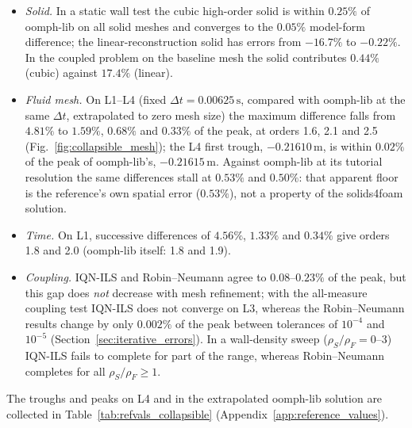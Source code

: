 \begin{itemize}
	\item \emph{Solid.} In a static wall test the cubic high-order solid is within $0.25\%$ of oomph-lib on all solid meshes and converges to the $0.05\%$ model-form difference; the linear-reconstruction solid has errors from $-16.7\%$ to $-0.22\%$. In the coupled problem on the baseline mesh the solid contributes $0.44\%$ (cubic) against $17.4\%$ (linear).
	\item \emph{Fluid mesh.} On L1--L4 (fixed $\Delta t = 0.00625\,\mathrm{s}$, compared with oomph-lib at the same $\Delta t$, extrapolated to zero mesh size) the maximum difference falls from $4.81\%$ to $1.59\%$, $0.68\%$ and $0.33\%$ of the peak, at orders 1.6, 2.1 and 2.5 (Fig.~\ref{fig:collapsible_mesh}); the L4 first trough, $-0.21610\,\mathrm{m}$, is within $0.02\%$ of the peak of oomph-lib's, $-0.21615\,\mathrm{m}$. Against oomph-lib at its tutorial resolution the same differences stall at $0.53\%$ and $0.50\%$: that apparent floor is the reference's own spatial error ($0.53\%$), not a property of the solids4foam solution.
	\item \emph{Time.} On L1, successive differences of $4.56\%$, $1.33\%$ and $0.34\%$ give orders 1.8 and 2.0 (oomph-lib itself: 1.8 and 1.9).
	\item \emph{Coupling.} IQN-ILS and Robin--Neumann agree to $0.08$--$0.23\%$ of the peak, but this gap does \emph{not} decrease with mesh refinement; with the all-measure coupling test IQN-ILS does not converge on L3, whereas the Robin--Neumann results change by only $0.002\%$ of the peak between tolerances of $10^{-4}$ and $10^{-5}$ (Section~\ref{sec:iterative_errors}). In a wall-density sweep ($\rho_S/\rho_F = 0$--3) IQN-ILS fails to complete for part of the range, whereas Robin--Neumann completes for all $\rho_S/\rho_F \geq 1$.
\end{itemize}
The troughs and peaks on L4 and in the extrapolated oomph-lib solution are collected in Table~\ref{tab:refvals_collapsible} (Appendix~\ref{app:reference_values}).

